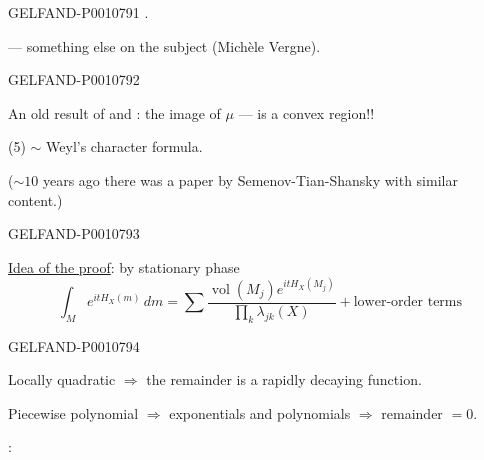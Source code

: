 \begin{GelfandAdjacentEvidence}{GELFAND-P001079}{1}
\quad{}.

 — something else on the subject (Michèle Vergne).
\end{GelfandAdjacentEvidence}
\begin{GelfandAdjacentEvidence}{GELFAND-P001079}{2}


An old result of  and :
the image of $\mu$ — is a convex region!!

(5) $\sim$ Weyl’s character formula.

($\sim10$ years ago there was a paper by Semenov-Tian-Shansky with similar content.)
\end{GelfandAdjacentEvidence}
\begin{GelfandAdjacentEvidence}{GELFAND-P001079}{3}


\uline{Idea of the proof}: by stationary phase
\begin{equation*}
\int_M e^{itH_X(m)}\,dm
=\sum\frac{\operatorname{vol}(M_j)e^{itH_X(M_j)}}
{\prod_k\lambda_{jk}(X)}+\text{lower-order terms}
\end{equation*}
\end{GelfandAdjacentEvidence}
\begin{GelfandAdjacentEvidence}{GELFAND-P001079}{4}


Locally quadratic $\Rightarrow$ the remainder is a rapidly decaying function.

Piecewise polynomial $\Rightarrow$ exponentials and polynomials $\Rightarrow$ remainder $=0$.

:
\end{GelfandAdjacentEvidence}
